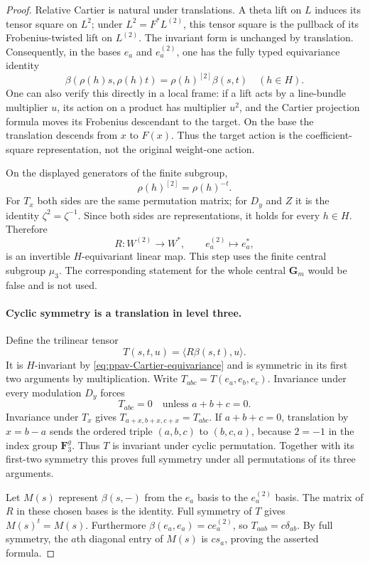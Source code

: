 \begin{proof}
Relative Cartier is natural under translations. A theta lift on $L$
induces its tensor square on $L^2$; under $L^2=F^*L^{(2)}$, this
tensor square is the pullback of its Frobenius-twisted lift on
$L^{(2)}$. The invariant form is unchanged by translation.
Consequently, in the bases $e_a$ and $e_a^{(2)}$, one has the
fully typed equivariance identity
\begin{equation}\label{eq:ppav-Cartier-equivariance}
 \beta(\rho(h)s,\rho(h)t)=\rho(h)^{[2]}\beta(s,t)
                         \quad(h\in H).
\end{equation}
One can also verify this directly in a local frame: if a lift acts
by a line-bundle multiplier $u$, its action on a product has multiplier
$u^2$, and the Cartier projection formula moves its Frobenius
descendant to the target. On the base the translation descends from
$x$ to $F(x)$. Thus the target action is the coefficient-square
representation, not the original weight-one action.

On the displayed generators of the finite subgroup,
\[
                \rho(h)^{[2]}=\rho(h)^{-t}.
\]
For $T_x$ both sides are the same permutation matrix; for $D_y$ and
$Z$ it is the identity $\zeta^2=\zeta^{-1}$. Since both sides are
representations, it holds for every $h\in H$.
Therefore
\[
 R:W^{(2)}\longrightarrow W^*,\qquad e_a^{(2)}\longmapsto e_a^*,
\]
is an invertible $H$-equivariant linear map. This step uses the finite
central subgroup $\mu_3$. The corresponding statement for the whole
central $\mathbf G_m$ would be false and is not used.

\paragraph{Cyclic symmetry is a translation in level three.}
Define the trilinear tensor
\[
                  T(s,t,u)=\langle R\beta(s,t),u\rangle.
\]
It is $H$-invariant by \eqref{eq:ppav-Cartier-equivariance} and is
symmetric in its first two arguments by multiplication.
Write $T_{abc}=T(e_a,e_b,e_c)$. Invariance under every modulation
$D_y$ forces
\[
            T_{abc}=0\quad\text{unless }a+b+c=0.
\]
Invariance under $T_x$ gives
$T_{a+x,b+x,c+x}=T_{abc}$.
If $a+b+c=0$, translation by $x=b-a$ sends the ordered triple
$(a,b,c)$ to $(b,c,a)$, because $2=-1$ in the index group
$\mathbf F_3^g$. Thus $T$ is invariant under cyclic permutation.
Together with its first-two symmetry this proves full symmetry
under all permutations of its three arguments.

Let $M(s)$ represent $\beta(s,-)$ from the $e_a$ basis to the
$e_a^{(2)}$ basis. The matrix of $R$ in these chosen bases is the
identity. Full symmetry of $T$ gives $M(s)^t=M(s)$.
Furthermore $\beta(e_a,e_a)=c e_a^{(2)}$, so
$T_{aab}=c\delta_{ab}$. By full symmetry, the $a$th diagonal
entry of $M(s)$ is $c s_a$, proving the asserted formula.


\end{proof}
